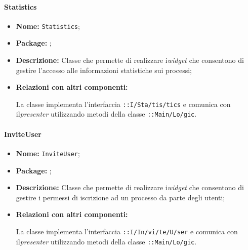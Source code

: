 \paragraph{Statistics}
\begin{flushleft}
\begin{itemize}
\item \textbf{Nome:} \texttt{Statistics};
\item \textbf{Package:} \texttt{\viewAdmin{}};
\item \textbf{Descrizione:} Classe che permette di realizzare i\textit{widget} che consentono di gestire l'accesso alle informazioni statistiche sui processi;
\item \textbf{Relazioni con altri componenti:}
\begin{sloppypar}
La classe implementa l'interfaccia \texttt{\iViewAdmin{}::I\fshyp{}Sta\fshyp{}tis\fshyp{}tics} e comunica con il\textit{presenter} utilizzando metodi della classe \texttt{\logicAdmin{}::Main\fshyp{}Lo\fshyp{}gic}.
\end{sloppypar}
\end{itemize}
\end{flushleft}

\paragraph{InviteUser}
\begin{flushleft}
\begin{itemize}
\item \textbf{Nome:} \texttt{InviteUser};
\item \textbf{Package:} \texttt{\viewAdmin{}};
\item \textbf{Descrizione:} Classe che permette di realizzare i\textit{widget} che consentono di gestire i permessi di iscrizione ad un processo da parte degli utenti;
\item \textbf{Relazioni con altri componenti:}
\begin{sloppypar}
La classe implementa l'interfaccia \texttt{\iViewAdmin{}::I\fshyp{}In\fshyp{}vi\fshyp{}te\fshyp{}U\fshyp{}ser} e comunica con il\textit{presenter} utilizzando metodi della classe \texttt{\logicAdmin{}::Main\fshyp{}Lo\fshyp{}gic}.
\end{sloppypar}
\end{itemize}
\end{flushleft}